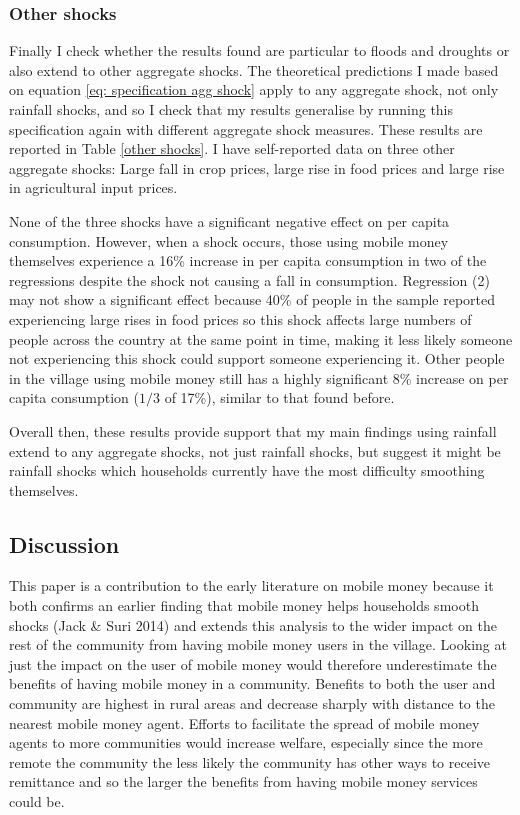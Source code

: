 
 
\subsubsection{Other shocks}
Finally I check whether the results found are particular to floods and droughts or also extend to other aggregate shocks. The theoretical predictions I made based on equation \eqref{eq: specification agg shock} apply to any aggregate shock, not only rainfall shocks, and so I check that my results generalise by running this specification again with different aggregate shock measures. These results are reported in Table \ref{other shocks}. I have self-reported data on three other aggregate shocks: Large fall in crop prices, large rise in food prices and large rise in agricultural input prices. 

None of the three shocks have a significant negative effect on per capita consumption. However, when a shock occurs, those using mobile money themselves experience a 16\% increase in per capita consumption in two of the regressions despite the shock not causing a fall in consumption. Regression (2) may not show a significant effect because 40\% of people in the sample reported experiencing large rises in food prices so this shock affects large numbers of people across the country at the same point in time, making it less likely someone not experiencing this shock could support someone experiencing it. Other people in the village using mobile money still has a highly significant 8\% increase on per capita consumption ($1/3$ of 17\%), similar to that found before. 

Overall then, these results provide support that my main findings using rainfall extend to any aggregate shocks, not just rainfall shocks, but suggest it might be rainfall shocks which households currently have the most difficulty smoothing themselves. 



\subsection{Discussion} 
This paper is a contribution to the early literature on mobile money because it both confirms an earlier finding that mobile money helps households smooth  shocks (Jack \& Suri 2014) and extends this analysis to the wider impact on the rest of the community from having mobile money users in the village. Looking at just the impact on the user of mobile money would therefore underestimate the benefits of having mobile money in a community. Benefits to both the user and community are highest in rural areas and decrease sharply with distance to the nearest mobile money agent. Efforts to facilitate the spread of mobile money agents to more communities would increase welfare, especially since the more remote the community the less likely the community has other ways to receive remittance and so the larger the benefits from having mobile money services could be. 

